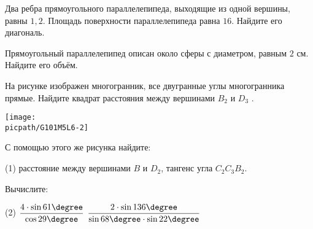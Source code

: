 \begin{homework}[number=3]
	\begin{listofex}
		\item Два ребра прямоугольного параллелепипеда, выходящие из одной вершины, равны \(1, 2\). Площадь поверхности параллелепипеда равна \(16\). Найдите его диагональ.
		\item Прямоугольный параллелепипед описан около сферы с диаметром, равным \(2\) см. Найдите его объём.
		\item 
		\begin{minipage}[t]{\bodywidth}
			На рисунке изображен многогранник, все двугранные углы многогранника прямые. Найдите квадрат расстояния между вершинами \(B_2\) и \(D_3\) .
		\end{minipage}
		\hspace{0.02\linewidth}
		\begin{minipage}[t]{\picwidth}
			\texttt{[image: \\picpath/G101M5L6-2]}
		\end{minipage}
		\item С помощью этого же рисунка найдите:
		\begin{tasks}(1)
			\task расстояние между вершинами \(B\) и \(D_2\),
			\task тангенс угла \(C_2C_3B_2\).
		\end{tasks}
		\item Вычислите:
		\begin{tasks}(2)
			\task \(\dfrac{4 \cdot \sin61\degree}{\cos29\degree}\)
			\task \(\dfrac{2 \cdot \sin136\degree}{\sin68\degree \cdot \sin22\degree}\)
		\end{tasks}
	\end{listofex}
\end{homework}

